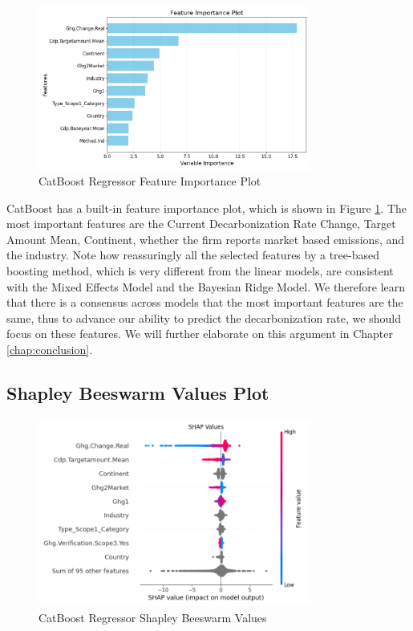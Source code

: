 \begin{figure}[H]
    \centering
    \includegraphics[width=0.8\textwidth]{figures/CatBoost_feature_importance.png}
    \caption{CatBoost Regressor Feature Importance Plot}
    \label{fig:CatBoost_feature_importance}
\end{figure}
\noindent CatBoost has a built-in feature importance plot, which is shown in Figure \ref{fig:CatBoost_feature_importance}. The most important features are the Current Decarbonization Rate Change, Target Amount Mean, Continent, whether the firm reports market based emissions, and the industry. Note how reassuringly all the selected features by a tree-based boosting method, which is very different from the linear models, are consistent with the Mixed Effects Model and the Bayesian Ridge Model. We therefore learn that there is a consensus across models that the most important features are the same, thus to advance our ability to predict the decarbonization rate, we should focus on these features. We will further elaborate on this argument in Chapter \ref{chap:conclusion}.


\subsection{Shapley Beeswarm Values Plot}

\begin{figure}[H]
    \centering
    \includegraphics[width=0.8\textwidth]{figures/CatBoost_shap_values_beeswarm.png}
    \caption{CatBoost Regressor Shapley Beeswarm Values}
    \label{fig:CatBoost_shapley_values}
\end{figure}

